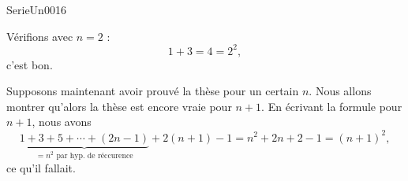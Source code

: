 

\begin{corrige}{SerieUn0016}

	Vérifions avec $n=2$ :
	\begin{equation}
		1+3=4=2^2,
	\end{equation}
	c'est bon.

	Supposons maintenant avoir prouvé la thèse pour un certain $n$. Nous allons montrer qu'alors la thèse est encore vraie pour $n+1$. En écrivant la formule pour $n+1$, nous avons
	\begin{equation}
		\underbrace{1+3+5+\cdots+(2n-1)}_{\text{$=n^2$ par hyp. de réccurence}}+2(n+1)-1=n^2+2n+2-1=(n+1)^2,
	\end{equation}
	ce qu'il fallait.

\end{corrige}
